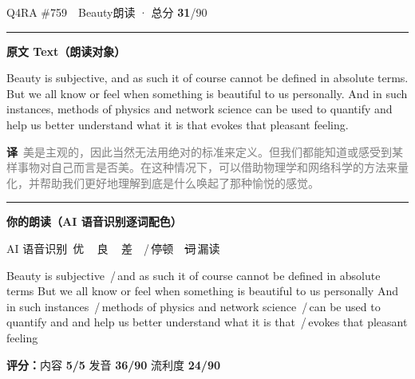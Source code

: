 \documentclass[11pt]{article}
\newcommand{\sfull}[1]{\textcolor{cFix}{\bfseries #1}}     %
\newcommand{\spart}[1]{\textcolor{cPartial}{\bfseries #1}} %
\newcommand{\ptesub}[1]{%
  \par\needspace{2\baselineskip}\smallskip
  {\color{cAccent}\rule[-0.2ex]{3pt}{1.05em}}\hspace{6pt}%
  {\bfseries\color{cHead}#1}\par\nopagebreak\smallskip}
\newcommand{\sg}[1]{\textcolor{cSpkGood}{#1}}   %
\newcommand{\sy}[1]{\textcolor{cSpkOk}{#1}}     %
\newcommand{\sr}[1]{\textcolor{cSpkBad}{#1}}    %
\newcommand{\pse}{{\color{gray}\,/\,}}          %
\newcommand{\asrlegend}{{\footnotesize\color{gray}AI 语音识别\quad
  {\color{cSpkGood}\textbullet}\,优\ \ {\color{cSpkOk}\textbullet}\,良\ \
  {\color{cSpkBad}\textbullet}\,差\ \ {\color{gray}/}\,停顿\ \
  {\color{cSpkBad}\sout{词}}\,漏读}}
\newcommand{\zh}[1]{{\footnotesize\textcolor{cNote}{\textbf{译}}\ \textcolor{gray}{#1}}}
\begin{document}
\begin{qblock}{Q4\quad RA \#759\ \ Beauty}{朗读 · 总分 \textcolor{cAccent}{\bfseries 31}/90}
\ptesub{原文 Text（朗读对象）}
\begin{promptbox}
Beauty is subjective, and as such it of course cannot be defined in absolute terms. But we all know or feel when something is beautiful to us personally. And in such instances, methods of physics and network science can be used to quantify and help us better understand what it is that evokes that pleasant feeling.
\end{promptbox}
\zh{美是主观的，因此当然无法用绝对的标准来定义。但我们都能知道或感受到某样事物对自己而言是否美。在这种情况下，可以借助物理学和网络科学的方法来量化，并帮助我们更好地理解到底是什么唤起了那种愉悦的感觉。}
\ptesub{你的朗读（AI 语音识别逐词配色）}
\asrlegend
\begin{asrbox}
\sg{Beauty} \sg{is} \sy{subjective} \pse \sg{and} \sg{as} \sg{such} \sy{it} \sg{of} \sg{course} \sg{cannot} \sg{be} \sy{defined} \sg{in} \sy{absolute} \sg{terms} \sg{But} \sg{we} \sg{all} \sg{know} \sg{or} \sg{feel} \sg{when} \sg{something} \sg{is} \sy{beautiful} \sg{to} \sy{us} \sy{personally} \sg{And} \sg{in} \sg{such} \sy{instances} \pse \sr{methods} \sg{of} \sr{physics} \sg{and} \sy{network} \sg{science} \pse \sg{can} \sg{be} \sg{used} \sg{to} \sg{quantify} \sg{and} \sg{and} \sy{help} \sg{us} \sg{better} \sy{understand} \sg{what} \sg{it} \sg{is} \sg{that} \pse \sy{evokes} \sy{that} \sg{pleasant} \sy{feeling}
\end{asrbox}
\smallskip
{\small\textbf{评分：}内容 \sfull{5/5} \quad\textperiodcentered\quad 发音 \spart{36/90} \quad\textperiodcentered\quad 流利度 \spart{24/90}}\quad{\footnotesize\color{gray}（用时 01:13）}
\end{qblock}
\end{document}

